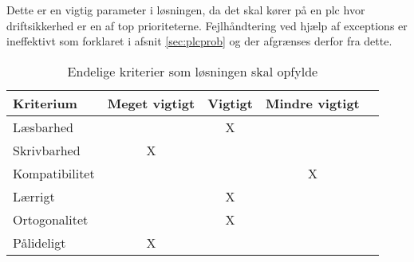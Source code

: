 Dette er en vigtig parameter i løsningen, da det skal kører på en \gls{plc} hvor driftsikkerhed er en af top prioriteterne. Fejlhåndtering ved hjælp af exceptions er ineffektivt som forklaret i afsnit \ref{sec:plcprob} og der afgrænses derfor fra dette.

\begin{table}[H]
\centering
{}
\begin{tabular}{l c c c c}
\toprule
\textbf{Kriterium} & \textbf{Meget vigtigt} & \textbf{Vigtigt} & \textbf{Mindre vigtigt}  \\ \midrule
Læsbarhed        &   & X &       \\ 
Skrivbarhed       & X &   &       \\ 
Kompatibilitet       &   &   & X     \\ 
Lærrigt       &   & X &       \\ 
Ortogonalitet      &   & X &       \\ 
Pålideligt        & X &   &       \\ \bottomrule
\end{tabular}
\caption{Endelige kriterier som løsningen skal opfylde}
\label{table:kriterier}
\end{table}





